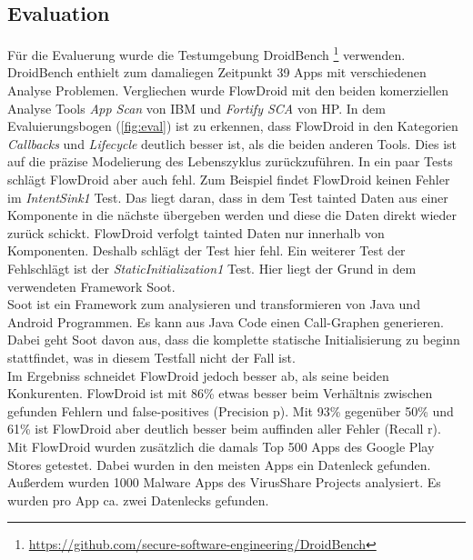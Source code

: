 \documentclass[runningheads]{llncs}
\begin{document}
\subsection{Evaluation}
Für die Evaluerung wurde die Testumgebung DroidBench \footnote{\url{https://github.com/secure-software-engineering/DroidBench}} verwenden. DroidBench enthielt zum damaliegen Zeitpunkt 39 Apps mit verschiedenen Analyse Problemen. Vergliechen wurde FlowDroid mit den beiden komerziellen Analyse Tools \emph{App Scan} von IBM und \emph{Fortify SCA} von HP. 
In dem Evaluierungsbogen (\ref{fig:eval}) ist zu erkennen, dass FlowDroid in den Kategorien \emph{Callbacks} und \emph{Lifecycle} deutlich besser ist, als die beiden anderen Tools. Dies ist auf die präzise Modelierung des Lebenszyklus zurückzuführen. In ein paar Tests schlägt FlowDroid aber auch fehl. Zum Beispiel findet FlowDroid keinen Fehler im \emph{IntentSink1} Test. Das liegt daran, dass in dem Test tainted Daten aus einer Komponente in die nächste übergeben werden und diese die Daten direkt wieder zurück schickt. FlowDroid verfolgt tainted Daten nur innerhalb von Komponenten. Deshalb schlägt der Test hier fehl. Ein weiterer Test der Fehlschlägt ist der \emph{StaticInitialization1} Test. Hier liegt der Grund in dem verwendeten Framework Soot. 
\\Soot ist ein Framework zum analysieren und transformieren von Java und Android Programmen. Es kann aus Java Code einen Call-Graphen generieren. Dabei geht Soot davon aus, dass die komplette statische Initialisierung zu beginn stattfindet, was in diesem Testfall nicht der Fall ist.
\\Im Ergebniss schneidet FlowDroid jedoch besser ab, als seine beiden Konkurenten. FlowDroid ist mit 86\% etwas besser beim Verhältnis zwischen gefunden Fehlern und false-positives (Precision p). Mit 93\% gegenüber 50\% und 61\% ist FlowDroid aber deutlich besser beim auffinden aller Fehler (Recall r).
\\Mit FlowDroid wurden zusätzlich die damals Top 500 Apps des Google Play Stores getestet. Dabei wurden in den meisten Apps ein Datenleck gefunden. 
\\Außerdem wurden 1000 Malware Apps des VirusShare Projects analysiert. Es wurden pro App ca. zwei Datenlecks gefunden.
\end{document}
